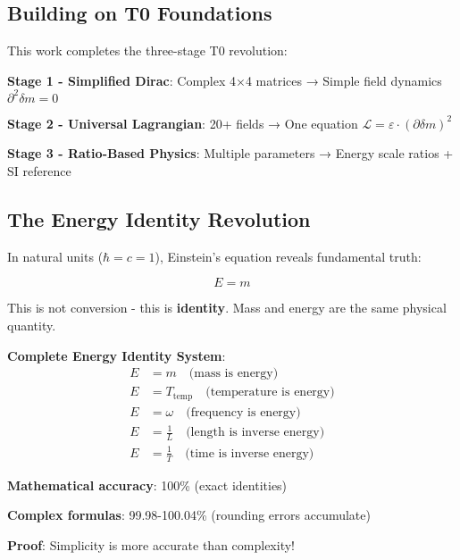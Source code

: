 \documentclass[12pt,a4paper]{article}
\newcommand{\Lag}{\mathcal{L}}
\newcommand{\deltam}{\delta m}
\theoremstyle{definition}
\theoremstyle{remark}
\begin{document}
	\subsection{Building on T0 Foundations}
	
	This work completes the three-stage T0 revolution:
	
	\textbf{Stage 1 - Simplified Dirac}: Complex 4×4 matrices → Simple field dynamics $\partial^2 \deltam = 0$
	
	\textbf{Stage 2 - Universal Lagrangian}: 20+ fields → One equation $\Lag = \varepsilon \cdot (\partial \deltam)^2$
	
	\textbf{Stage 3 - Ratio-Based Physics}: Multiple parameters → Energy scale ratios + SI reference
	
	\subsection{The Energy Identity Revolution}
	
	In natural units ($\hbar = c = 1$), Einstein's equation reveals fundamental truth:
	
	\begin{equation}
		\boxed{E = m}
		\label{eq:energy_mass_identity}
	\end{equation}
	
	This is not conversion - this is \textbf{identity}. Mass and energy are the same physical quantity.
	
	\begin{tcolorbox}[colback=blue!5!white,colframe=blue!75!black,title=Universal Energy Relations]
		\textbf{Complete Energy Identity System}:
		\begin{align}
			E &= m \quad \text{(mass is energy)} \\
			E &= T_{\text{temp}} \quad \text{(temperature is energy)} \\
			E &= \omega \quad \text{(frequency is energy)} \\
			E &= \frac{1}{L} \quad \text{(length is inverse energy)} \\
			E &= \frac{1}{T} \quad \text{(time is inverse energy)}
		\end{align}
		
		\textbf{Mathematical accuracy}: 100\% (exact identities)
		
		\textbf{Complex formulas}: 99.98-100.04\% (rounding errors accumulate)
		
		\textbf{Proof}: Simplicity is more accurate than complexity!
	\end{tcolorbox}
	
\end{document}
